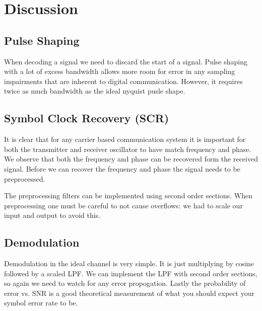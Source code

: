 \documentclass{article}
\begin{document}

\section{Discussion}

\subsection{Pulse Shaping}

When decoding a signal we need to discard the start of a signal.
Pulse shaping with a lot of excess bandwidth allows more room for error in any sampling impairments that are inherent to digital communication.
However, it requires twice as much bandwidth as the ideal nyquist pusle shape.

\subsection{Symbol Clock Recovery (SCR)}

It is clear that for any carrier based communication system it is important for both the transmitter and receiver oscillator to have match frequency and phase.
We observe that both the frequency and phase can be recovered form the received signal.
Before we can recover the frequency and phase the signal needs to be preprocessed.

The preprocessing filters can be implemented using second order sections.
When preprocessing one must be careful to not cause overflows: we had to scale our input and output to avoid this.

\subsection{Demodulation}

Demodulation in the ideal channel is very simple. It is just multiplying by cosine followed by a scaled LPF.
We can implement the LPF with second order sections, so again we need to watch for any error propogation.
Lastly the probability of error vs. SNR is a good theoretical measurement of what you should expect your symbol error rate to be.

\end{document}
